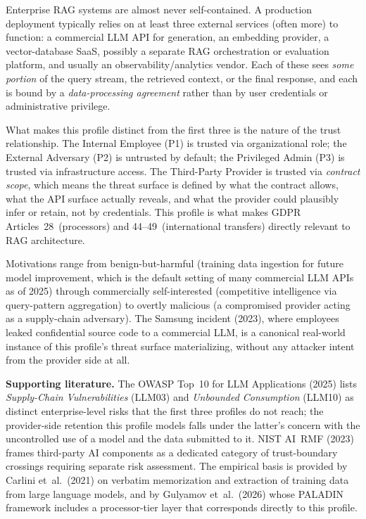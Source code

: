\documentclass[12pt,a4paper]{report}
\begin{document}
\begin{prosebox}
Enterprise RAG systems are almost never self-contained. A production
deployment typically relies on at least three external services (often
more) to function: a commercial LLM API for generation, an embedding
provider, a vector-database SaaS, possibly a separate RAG orchestration
or evaluation platform, and usually an observability/analytics vendor. Each
of these sees \emph{some portion} of the query stream, the retrieved
context, or the final response, and each is bound by a
\emph{data-processing agreement} rather than by user credentials or
administrative privilege.

What makes this profile distinct from the first three is the nature of
the trust relationship. The Internal Employee (P1) is trusted via
organizational role; the External Adversary (P2) is untrusted by default;
the Privileged Admin (P3) is trusted via infrastructure access. The
Third-Party Provider is trusted via \emph{contract scope}, which means
the threat surface is defined by what the contract allows, what the API
surface actually reveals, and what the provider could plausibly infer or
retain, not by credentials. This profile is what makes GDPR
Articles~28~(processors) and 44--49~(international transfers) directly
relevant to RAG architecture.

Motivations range from benign-but-harmful (training data ingestion for
future model improvement, which is the default setting of many commercial
LLM APIs as of 2025) through commercially self-interested (competitive
intelligence via query-pattern aggregation) to overtly malicious
(a compromised provider acting as a supply-chain adversary). The Samsung
incident (2023), where employees leaked confidential source code to a
commercial LLM, is a canonical real-world instance of this profile's
threat surface materializing, without any attacker intent from the
provider side at all.

\medskip
\textbf{Supporting literature.}
The OWASP Top~10 for LLM Applications (2025) lists
\emph{Supply-Chain Vulnerabilities} (LLM03) and \emph{Unbounded Consumption}
(LLM10) as distinct enterprise-level risks that the first three profiles do not
reach; the provider-side retention this profile models falls under the latter's
concern with the uncontrolled use of a model and the data submitted to it.
NIST AI~RMF (2023) frames third-party AI components as a dedicated
category of trust-boundary crossings requiring separate risk assessment.
The empirical basis is provided by Carlini et~al.\ (2021) on verbatim
memorization and extraction of training data from large language models, and by
Gulyamov et~al.\ (2026) whose PALADIN framework includes a processor-tier
layer that corresponds directly to this profile.
\end{prosebox}
\end{document}
